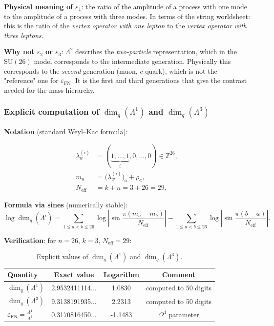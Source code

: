 \documentclass[11pt,a4paper]{article}
\newcommand{\SU}{\ensuremath{\mathrm{SU}}}
\newcommand{\Om}{\ensuremath{\Omega^4}}
\newcommand{\Neff}{\ensuremath{N_{\text{eff}}}}
\newcommand{\epsFN}{\ensuremath{\varepsilon_{\text{FN}}}}
\theoremstyle{definition}
\begin{document}
\medskip\noindent
\textbf{Physical meaning of $\varepsilon_1$}: the ratio of the amplitude
of a process with one mode to the amplitude of a process with three modes.
In terms of the string worldsheet: this is the ratio of the
\emph{vertex operator with one lepton} to the
\emph{vertex operator with three leptons}.

\medskip\noindent
\textbf{Why not $\varepsilon_2$ or $\varepsilon_3$}: $\Lambda^2$
describes the \emph{two-particle} representation, which in the
$\SU(26)$ model corresponds to the intermediate generation.
Physically this corresponds to the \emph{second} generation
(muon, $c$-quark), which is not the "reference" one for
$\epsFN$. It is the first and third generations that give
the contrast needed for the mass hierarchy.

\subsubsection{Explicit computation of \texorpdfstring{$\dim_q(\Lambda^1)$}{\_q(\textasciicircum 1)} and \texorpdfstring{$\dim_q(\Lambda^3)$}{\_q(\textasciicircum 3)}}

\textbf{Notation} (standard Weyl--Kac formula):

\begin{align}
    \lambda_w^{(i)} &= (\underbrace{1, \ldots, 1}_{i}, 0, \ldots, 0)
    \in \mathbb{Z}^{26}, \\
    m_a &= \bigl(\lambda_w^{(i)}\bigr)_a + \rho_a, \\
    \Neff &= k + n = 3 + 26 = 29.
\end{align}

\textbf{Formula via sines} (numerically stable):
\begin{equation}
    \log \dim_q(\Lambda^i) =
    \sum_{1 \le a < b \le 26}
    \log \left| \sin \frac{\pi (m_a - m_b)}{\Neff} \right|
    - \sum_{1 \le a < b \le 26}
    \log \left| \sin \frac{\pi (b - a)}{\Neff} \right|.
\end{equation}

\textbf{Verification}: for $n = 26$, $k = 3$, $\Neff = 29$:

\begin{table}[ht]
\centering
\caption{Explicit values of \texorpdfstring{$\dim_q(\Lambda^1)$}{\_q(^1)} and \texorpdfstring{$\dim_q(\Lambda^3)$}{\_q(^3)}.}
\label{tab:dim-q-values}
\begin{tabular}{lccc}
\toprule
Quantity & Exact value & Logarithm & Comment \\
\midrule
$\dim_q(\Lambda^1)$ & 2.9532411114... & 1.0830 & computed to 50 digits \\
$\dim_q(\Lambda^3)$ & 9.3138191935... & 2.2313 & computed to 50 digits \\
\midrule
$\epsFN = \frac{\Lambda^1}{\Lambda^3}$ & 0.3170816450... & -1.1483 &
$\Om$ parameter \\
\bottomrule
\end{tabular}
\end{table}
\end{document}
